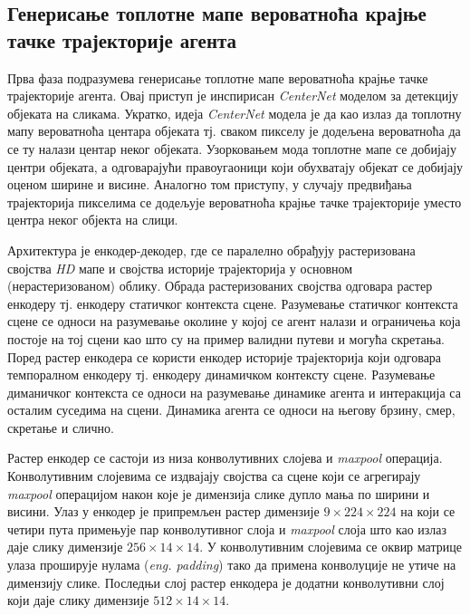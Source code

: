 \documentclass[11pt,oneside]{memoir}
\begin{document}
\subsection{Генерисање топлотне мапе вероватноћа крајње тачке трајекторије агента}

Прва фаза подразумева генерисање топлотне мапе вероватноћа крајње тачке трајекторије агента. Овај приступ је инспирисан \textit{CenterNet} \cite{centernet}
моделом за детекцију објеката на сликама. Укратко, идеја \textit{CenterNet} модела је да као излаз да топлотну мапу вероватноћа центара објеката тј.
сваком пикселу је додељена вероватноћа да се ту налази центар неког објеката. Узорковањем мода топлотне мапе се добијају центри објеката,
а одговарајући правоугаоници који обухватају објекат се добијају оценом ширине и висине. Аналогно том приступу, у случају предвиђања
трајекторија пикселима се додељује вероватноћа крајње тачке трајекторије уместо центра неког објекта на слици. 

Архитектура је енкодер-декодер, где се паралелно обрађују растеризована својства \textit{HD} мапе и својства историје трајекторија 
у основном (нерастеризованом) облику.
Обрада растеризованих својства одговара растер енкодеру тј. енкодеру статичког контекста сцене. Разумевање статичког контекста сцене се односи
на разумевање околине у којој се агент налази и ограничења која постоје на тој сцени као што су на пример валидни путеви и могућа скретања. 
Поред растер енкодера се користи енкодер историје трајекторија који одговара темпоралном енкодеру тј. енкодеру динамичком контексту сцене. 
Разумевање диманичког контекста се односи на разумевање динамике агента и интеракција са осталим суседима на сцени. 
Динамика агента се односи на његову брзину, смер, скретање и слично. 

Растер енкодер се састоји из низа конволутивних слојева и \textit{maxpool} операција. Конволутивним слојевима се издвајају
својства са сцене који се агрегирају \textit{maxpool} операцијом након које је димензија слике дупло мања по ширини и висини. 
Улаз у енкодер је припремљен растер димензије $9\times 224\times 224$ на који се четири пута примењује пар конволутивног слоја и \textit{maxpool}
слоја што као излаз даје слику димензије $256\times 14\times 14$. У конволутивним слојевима се оквир матрице улаза проширује нулама (\textit{eng. padding}) 
тако да примена конволуције не утиче на димензију слике. Последњи слој растер енкодера је додатни конволутивни слој који даје слику димензије
$512\times 14\times 14$. \cite{home}
\end{document}
